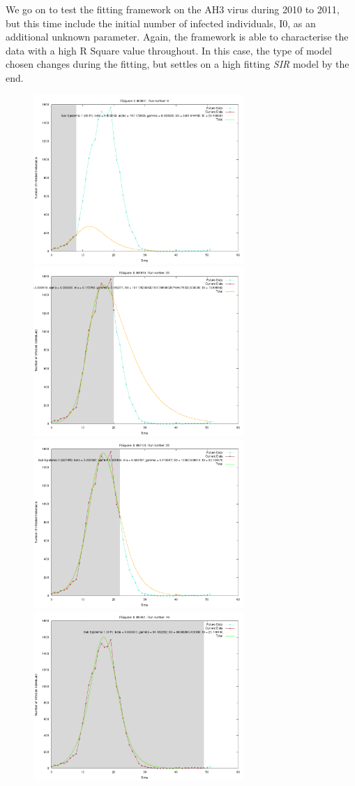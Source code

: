 We go on to test the fitting framework on the AH3 virus during 2010 to
2011, but this time include the initial number of infected
individuals, I0, as an additional unknown parameter. Again, the
framework is able to characterise the data with a high R Square value
throughout. In this case, the type of model chosen changes during the
fitting, but settles on a high fitting \emph{SIR} model by the end.

\begin{centering}
\begin{figure}[h!]
  \includegraphics[width=8cm]{images/single/ah3.png}
  \includegraphics[width=8cm]{images/single/ah3b.png}
  \includegraphics[width=8cm]{images/single/ah3c.png}
  \includegraphics[width=8cm]{images/single/ah3d.png}

\end{figure}
\end{centering}
